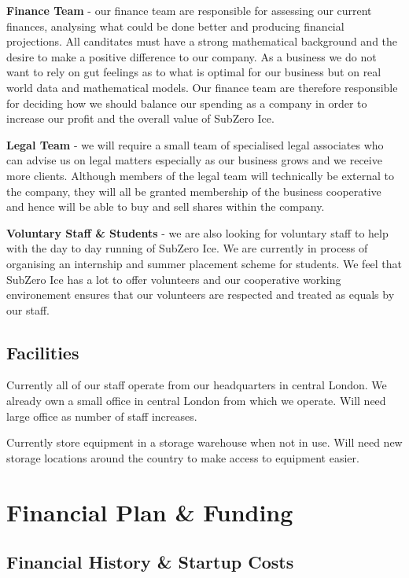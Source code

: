 \documentclass{article}
\begin{document}
 {\bf Finance Team} - our finance team are responsible for assessing our current finances, analysing what could be done better and producing financial projections. All canditates must have a strong mathematical background and the desire to make a positive difference to our company. As a business we do not want to rely on gut feelings as to what is optimal for our business but on real world data and mathematical models. Our finance team are therefore responsible for deciding how we should balance our spending as a company in order to increase our profit and the overall value of SubZero Ice.

 {\bf Legal Team} - we will require a small team of specialised legal associates who can advise us on legal matters especially as our business grows and we receive more clients. Although members of the legal team will technically be external to the company, they will all be granted membership of the business cooperative and hence will be able to buy and sell shares within the company.

 {\bf Voluntary Staff \& Students} - we are also looking for voluntary staff to help with the day to day running of SubZero Ice. We are currently in process of organising an internship and summer placement scheme for students. We feel that SubZero Ice has a lot to offer volunteers and our cooperative working environement ensures that our volunteers are respected and treated as equals by our staff.


  \subsection{Facilities}

  Currently all of our staff operate from our headquarters in central London.
  We already own a small office in central London from which we operate.
  Will need large office as number of staff increases.

  Currently store equipment in a storage warehouse when not in use.
  Will need new storage locations around the country to make access to equipment easier.


\section{Financial Plan \& Funding}

\subsection{Financial History \& Startup Costs}
\end{document}
